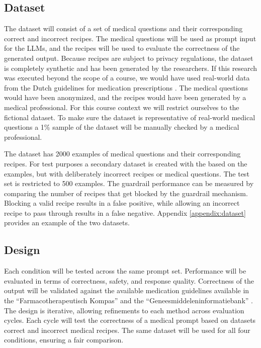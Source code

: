 \documentclass[a4paper,doc,natbib]{apa6}
\begin{document}
    \subsection{Dataset}

    The dataset will consist of a set of medical questions and their corresponding correct and incorrect recipes.
    The medical questions will be used as prompt input for the LLMs, and the recipes will be used to evaluate the correctness of the generated output.
    Because recipes are subject to privacy regulations, the dataset is completely synthetic and has been generated by the researchers.
    If this research was executed beyond the scope of a course, we would have used real-world data from the Dutch guidelines for medication prescriptions \citep{farmacotherapeutischkompas}.
    The medical questions would have been anonymized, and the recipes would have been generated by a medical professional.
    For this course context we will restrict ourselves to the fictional dataset.
    To make sure the dataset is representative of real-world medical questions a 1\% sample of the dataset will be manually checked by a medical professional.

    The dataset has 2000 examples of medical questions and their corresponding recipes.
    For test purposes a secondary dataset is created with the based on the examples, but with deliberately incorrect recipes or medical questions.
    The test set is restricted to 500 examples.
    The guardrail performance can be measured by comparing the number of recipes that get blocked by the guardrail mechanism.
    Blocking a valid recipe results in a false positive, while allowing an incorrect recipe to pass through results in a false negative.
    Appendix \ref{appendix:dataset} provides an example of the two datasets.

    \subsection{Design}

    Each condition will be tested across the same prompt set.
    Performance will be evaluated in terms of correctness, safety, and response quality.
    Correctness of the output will be validated against the available medication guidelines available in the ``Farmacotherapeutisch Kompas'' \citep{farmacotherapeutischkompas} and the ``Geneesmiddeleninformatiebank'' \citep{geneesmiddeleninformatiebank}.
    The design is iterative, allowing refinements to each method across evaluation cycles.
    Each cycle will test the correctness of a medical prompt based on datasets correct and incorrect medical recipes.
    The same dataset will be used for all four conditions, ensuring a fair comparison.
\end{document}
